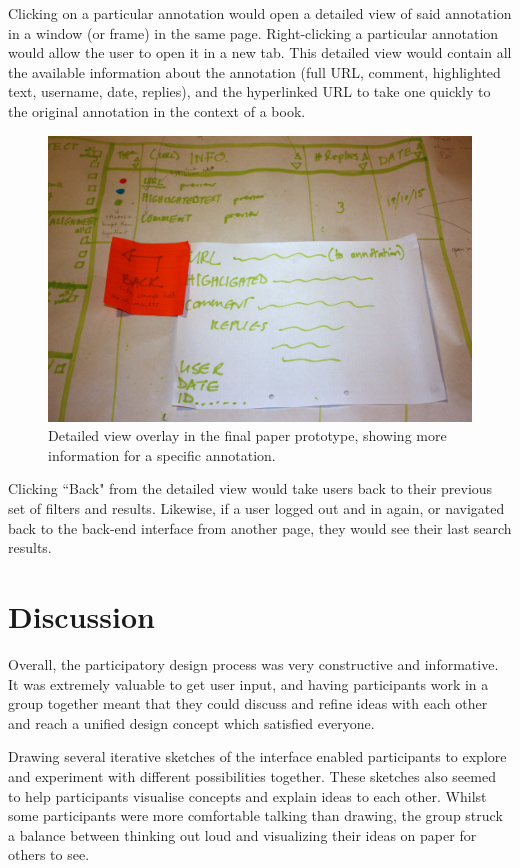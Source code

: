Clicking on a particular annotation would open a detailed view of said annotation in a window (or frame) in the same page. Right-clicking a particular annotation would allow the user to open it in a new tab. This detailed view would contain all the available information about the annotation (full URL, comment, highlighted text, username, date, replies), and the hyperlinked URL to take one quickly to the original annotation in the context of a book.
\begin{figure}[h!]
    \centering
    \includegraphics[width=\textwidth]{Figures/IMG_9044.JPG}
 \caption{Detailed view overlay in the final paper prototype, showing more information for a specific annotation.}
\end{figure}
Clicking ``Back" from the detailed view would take users back to their previous set of filters and results. Likewise, if a user logged out and in again, or navigated back to the back-end interface from another page, they would see their last search results. 

\section{Discussion}
Overall, the participatory design process was very constructive and informative. It was extremely valuable to get user input, and having participants work in a group together meant that they could discuss and refine ideas with each other and reach a unified design concept which satisfied everyone. 

Drawing several iterative sketches of the interface enabled participants to explore and experiment with different possibilities together. These sketches also seemed to help participants visualise concepts and explain ideas to each other. Whilst some participants were more comfortable talking than drawing, the group struck a balance between thinking out loud and visualizing their ideas on paper for others to see.

